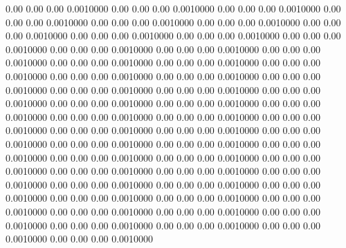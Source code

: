    0.00    0.00    0.00   0.0010000
   0.00    0.00    0.00   0.0010000
   0.00    0.00    0.00   0.0010000
   0.00    0.00    0.00   0.0010000
   0.00    0.00    0.00   0.0010000
   0.00    0.00    0.00   0.0010000
   0.00    0.00    0.00   0.0010000
   0.00    0.00    0.00   0.0010000
   0.00    0.00    0.00   0.0010000
   0.00    0.00    0.00   0.0010000
   0.00    0.00    0.00   0.0010000
   0.00    0.00    0.00   0.0010000
   0.00    0.00    0.00   0.0010000
   0.00    0.00    0.00   0.0010000
   0.00    0.00    0.00   0.0010000
   0.00    0.00    0.00   0.0010000
   0.00    0.00    0.00   0.0010000
   0.00    0.00    0.00   0.0010000
   0.00    0.00    0.00   0.0010000
   0.00    0.00    0.00   0.0010000
   0.00    0.00    0.00   0.0010000
   0.00    0.00    0.00   0.0010000
   0.00    0.00    0.00   0.0010000
   0.00    0.00    0.00   0.0010000
   0.00    0.00    0.00   0.0010000
   0.00    0.00    0.00   0.0010000
   0.00    0.00    0.00   0.0010000
   0.00    0.00    0.00   0.0010000
   0.00    0.00    0.00   0.0010000
   0.00    0.00    0.00   0.0010000
   0.00    0.00    0.00   0.0010000
   0.00    0.00    0.00   0.0010000
   0.00    0.00    0.00   0.0010000
   0.00    0.00    0.00   0.0010000
   0.00    0.00    0.00   0.0010000
   0.00    0.00    0.00   0.0010000
   0.00    0.00    0.00   0.0010000
   0.00    0.00    0.00   0.0010000
   0.00    0.00    0.00   0.0010000
   0.00    0.00    0.00   0.0010000
   0.00    0.00    0.00   0.0010000
   0.00    0.00    0.00   0.0010000
   0.00    0.00    0.00   0.0010000
   0.00    0.00    0.00   0.0010000
   0.00    0.00    0.00   0.0010000
   0.00    0.00    0.00   0.0010000
   0.00    0.00    0.00   0.0010000
   0.00    0.00    0.00   0.0010000
   0.00    0.00    0.00   0.0010000
   0.00    0.00    0.00   0.0010000
   0.00    0.00    0.00   0.0010000
   0.00    0.00    0.00   0.0010000
   0.00    0.00    0.00   0.0010000
